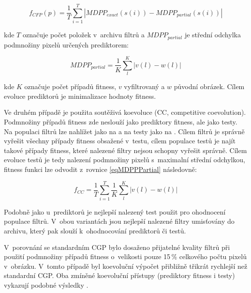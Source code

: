 \begin{equation}
    \label{eqFpredictorIF}
    f_{\mathit{CFP}} \left( p \right) = \frac{1}{T} \sum\limits_{i=1}^{T} \left| \mathit{MDPP_{exact}} \left( s \left( i \right) \right) - \mathit{MDPP_{partial}} \left( s \left( i \right) \right) \right|
\end{equation}

\noindent{}kde $T$ označuje počet položek v~archivu filtrů a $\mathit{MDPP_{partial}}$ je střední odchylka podmnožiny pixelů určených prediktorem:

\begin{equation}
    \label{eqMDPPPartial}
    \mathit{MDPP_{partial}} = \frac{1}{K} \sum\limits_l^K \left| v\left( l \right) - w\left( l \right) \right|
\end{equation}

\noindent{}kde $K$ označuje počet případů fitness, $v$ vyfiltrovaný a $w$ původní obrázek. Cílem evoluce prediktorů je minimalizace hodnoty fitness.

Ve druhém případě je použita soutěživá koevoluce (CC, competitive coevolution). Podmnožiny případů fitness zde neslouží jako prediktory fitness, ale jako testy. Na populaci filtrů lze nahlížet jako na  a na testy jako na . Cílem filtrů je správně vyřešit všechny případy fitness obsažené v~testu, cílem populace testů je najít takové případy fitness, které nalezené filtry nejsou schopny vyřešit správně.
Cílem evoluce testů je tedy nalezení podmnožiny pixelů s~maximalní střední odchylkou, fitness funkci lze odvodit z~rovnice \ref{eqMDPPPartial} následovně:

\begin{equation}
    \label{eqFtestsIF}
    f_{\mathit{CC}} = \frac{1}{T} \sum\limits_{i=1}^{T} \frac{1}{K} \sum\limits_l^K \left| v\left( l \right) - w\left( l \right) \right|
\end{equation}

Podobně jako u~prediktorů je nejlepší nalezený test použit pro ohodnocení populace filtrů. V~obou variantách jsou nejlepší nalezené filtry umisťovány do archivu, který pak slouží k~ohodnocování prediktorů či testů.

V~porovnání se standardním CGP bylo dosaženo přijatelné kvality filtrů při použití podmnožiny případů fitness o~velikosti pouze 15\,\% celkového počtu pixelů v~obrázku. V~tomto případě byl koevoluční výpočet přibližně třikrát rychlejší než standardní CGP. Oba zmíněné koevoluční přístupy (prediktory fitness i testy) vykazují podobné výsledky \cite{SikuPPSN}.

